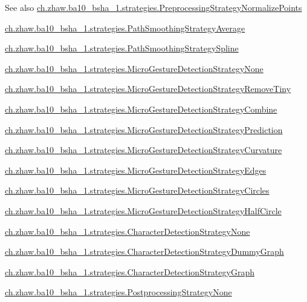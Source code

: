 \begin{DoxySeeAlso}{See also}
\hyperlink{classch_1_1zhaw_1_1ba10__bsha__1_1_1strategies_1_1PreprocessingStrategyNormalizePoints}{ch.zhaw.ba10\_\-bsha\_\-1.strategies.PreprocessingStrategyNormalizePoints} 

\hyperlink{classch_1_1zhaw_1_1ba10__bsha__1_1_1strategies_1_1PathSmoothingStrategyAverage}{ch.zhaw.ba10\_\-bsha\_\-1.strategies.PathSmoothingStrategyAverage} 

\hyperlink{classch_1_1zhaw_1_1ba10__bsha__1_1_1strategies_1_1PathSmoothingStrategySpline}{ch.zhaw.ba10\_\-bsha\_\-1.strategies.PathSmoothingStrategySpline} 

\hyperlink{classch_1_1zhaw_1_1ba10__bsha__1_1_1strategies_1_1MicroGestureDetectionStrategyNone}{ch.zhaw.ba10\_\-bsha\_\-1.strategies.MicroGestureDetectionStrategyNone} 

\hyperlink{classch_1_1zhaw_1_1ba10__bsha__1_1_1strategies_1_1MicroGestureDetectionStrategyRemoveTiny}{ch.zhaw.ba10\_\-bsha\_\-1.strategies.MicroGestureDetectionStrategyRemoveTiny} 

\hyperlink{classch_1_1zhaw_1_1ba10__bsha__1_1_1strategies_1_1MicroGestureDetectionStrategyCombine}{ch.zhaw.ba10\_\-bsha\_\-1.strategies.MicroGestureDetectionStrategyCombine} 

\hyperlink{classch_1_1zhaw_1_1ba10__bsha__1_1_1strategies_1_1MicroGestureDetectionStrategyPrediction}{ch.zhaw.ba10\_\-bsha\_\-1.strategies.MicroGestureDetectionStrategyPrediction} 

\hyperlink{classch_1_1zhaw_1_1ba10__bsha__1_1_1strategies_1_1MicroGestureDetectionStrategyCurvature}{ch.zhaw.ba10\_\-bsha\_\-1.strategies.MicroGestureDetectionStrategyCurvature} 

\hyperlink{classch_1_1zhaw_1_1ba10__bsha__1_1_1strategies_1_1MicroGestureDetectionStrategyEdges}{ch.zhaw.ba10\_\-bsha\_\-1.strategies.MicroGestureDetectionStrategyEdges} 

\hyperlink{classch_1_1zhaw_1_1ba10__bsha__1_1_1strategies_1_1MicroGestureDetectionStrategyCircles}{ch.zhaw.ba10\_\-bsha\_\-1.strategies.MicroGestureDetectionStrategyCircles} 

\hyperlink{classch_1_1zhaw_1_1ba10__bsha__1_1_1strategies_1_1MicroGestureDetectionStrategyHalfCircle}{ch.zhaw.ba10\_\-bsha\_\-1.strategies.MicroGestureDetectionStrategyHalfCircle} 

\hyperlink{classch_1_1zhaw_1_1ba10__bsha__1_1_1strategies_1_1CharacterDetectionStrategyNone}{ch.zhaw.ba10\_\-bsha\_\-1.strategies.CharacterDetectionStrategyNone} 

\hyperlink{classch_1_1zhaw_1_1ba10__bsha__1_1_1strategies_1_1CharacterDetectionStrategyDummyGraph}{ch.zhaw.ba10\_\-bsha\_\-1.strategies.CharacterDetectionStrategyDummyGraph} 

\hyperlink{classch_1_1zhaw_1_1ba10__bsha__1_1_1strategies_1_1CharacterDetectionStrategyGraph}{ch.zhaw.ba10\_\-bsha\_\-1.strategies.CharacterDetectionStrategyGraph} 

\hyperlink{classch_1_1zhaw_1_1ba10__bsha__1_1_1strategies_1_1PostprocessingStrategyNone}{ch.zhaw.ba10\_\-bsha\_\-1.strategies.PostprocessingStrategyNone}
\end{DoxySeeAlso}
